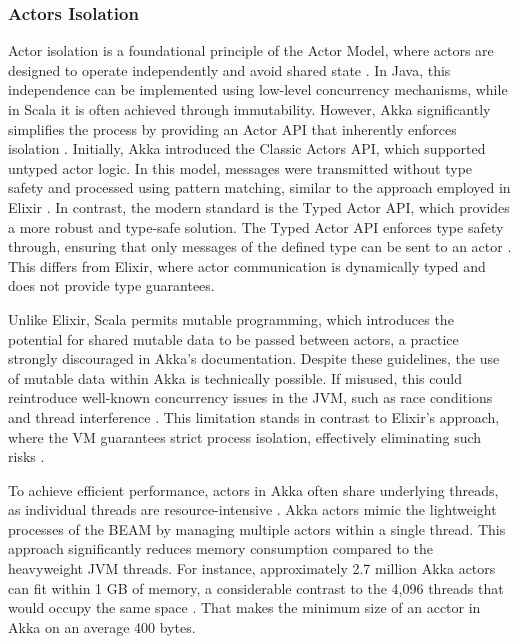 \subsubsection{Actors Isolation}

Actor isolation is a foundational principle of the Actor Model, where actors are designed to operate independently and avoid shared state \cite{Armstrong2013}. In Java, this independence can be implemented using low-level concurrency mechanisms, while in Scala it is often achieved through immutability. However, Akka significantly simplifies the process by providing an Actor API that inherently enforces isolation \cite{Abraham2023,Bagherzadeh2020}. Initially, Akka introduced the Classic Actors API, which supported untyped actor logic. In this model, messages were transmitted without type safety and processed using pattern matching, similar to the approach employed in Elixir \cite{akka-docs}. In contrast, the modern standard is the Typed Actor API, which provides a more robust and type-safe solution. The Typed Actor API enforces type safety through, ensuring that only messages of the defined type can be sent to an actor \cite{Abraham2023,akka-docs}. This differs from Elixir, where actor communication is dynamically typed and does not provide type guarantees.

Unlike Elixir, Scala permits mutable programming, which introduces the potential for shared mutable data to be passed between actors, a practice strongly discouraged in Akka’s documentation. Despite these guidelines, the use of mutable data within Akka is technically possible. If misused, this could reintroduce well-known concurrency issues in the JVM, such as race conditions and thread interference \cite{akka-docs}. This limitation stands in contrast to Elixir’s approach, where the \gls{VM} guarantees strict process isolation, effectively eliminating such risks \cite{Juric2024,Valkov2018}.

To achieve efficient performance, actors in Akka often share underlying threads, as individual threads are resource-intensive \cite{Moamen2027}. Akka actors mimic the lightweight processes of the \gls{BEAM} by managing multiple actors within a single thread. This approach significantly reduces memory consumption compared to the heavyweight \gls{JVM} threads. For instance, approximately 2.7 million Akka actors can fit within 1 GB of memory, a considerable contrast to the 4,096 threads that would occupy the same space \cite{Abraham2023}. That makes the minimum size of an acctor in Akka on an average 400 bytes.

